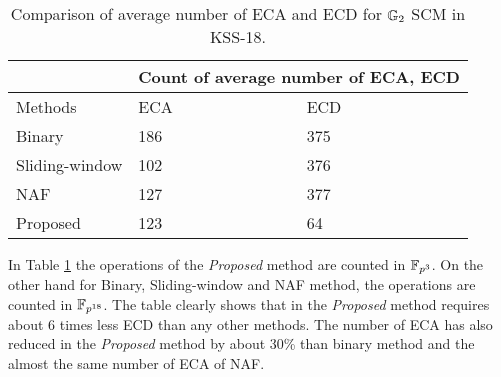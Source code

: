 \renewcommand{\baselinestretch}{1.5}
\begin{table}[ht]
	\centering
	\caption{Comparison of average number of ECA and ECD for ${\mathbb{G}}_{2}$ SCM in KSS-18.}
	\label{table:operationcount_chapter_g2scm_kss18}
	\begin{tabular}{l|l|l|}
		\cline{2-3}
		& \multicolumn{2}{l|}{Count of average number of ECA, ECD} \\ \hline
		\multicolumn{1}{|l|}{Methods}        & ECA      \quad     \quad       \quad \quad     \quad       \quad       & ECD                        \\ \hline
		\multicolumn{1}{|l|}{Binary}         & 186                         & 375                        \\ \hline
		\multicolumn{1}{|l|}{Sliding-window} & 102                         & 376                        \\ \hline
		\multicolumn{1}{|l|}{NAF}            & 127                         & 377                        \\ \hline
		\multicolumn{1}{|l|}{Proposed}       & 123                         & 64                         \\ \hline
	\end{tabular}
\end{table}
\renewcommand{\baselinestretch}{1.0}
In Table \ref{table:operationcount_chapter_g2scm_kss18} the operations of the \textit{Proposed} method are counted in $\mathbb{F}_{p^3}$. On the other hand for Binary, Sliding-window and NAF method, the operations are counted in $\mathbb{F}_{p^{18}}$.  The table clearly shows that in the \textit{Proposed} method requires about 6 times less ECD than any other methods.
The number of ECA has also reduced in the \textit{Proposed} method by about 30\% than binary method and the almost the same number of ECA of NAF. 

